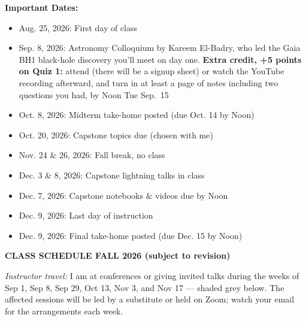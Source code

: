 {\bf \headerfont \color{RoyalBlue} Important Dates:}

\begin{itemize}
    \setlength\itemsep{0.05em}
    \footnotesize
    \item Aug. 25, 2026: First day of class\\
    \item Sep. \phantom{0}8, 2026: Astronomy Colloquium by Kareem El-Badry, who led the Gaia BH1 black-hole discovery you'll meet on day one. {\bf Extra credit, +5 points on Quiz 1:} attend (there will be a signup sheet) or watch the YouTube recording afterward, and turn in at least a page of notes including two questions you had, by Noon Tue Sep.~15\\
    \item Oct. \phantom{0}8, 2026: Midterm take-home posted (due Oct. 14 by Noon)\\
    \item Oct. 20, 2026: Capstone topics due (chosen with me)\\
    \item Nov. 24 \& 26, 2026: Fall break, no class\\
    \item Dec. \phantom{0}3 \& 8, 2026: Capstone lightning talks in class\\
    \item Dec. \phantom{0}7, 2026: Capstone notebooks \& videos due by Noon\\
    \item Dec. \phantom{0}9, 2026: Last day of instruction\\
    \item Dec. \phantom{0}9, 2026: Final take-home posted (due Dec. 15 by Noon)\\
\end{itemize}

{\large \bf \headerfont \color{RoyalBlue} CLASS SCHEDULE FALL 2026 (subject to revision)}

{\footnotesize \emph{Instructor travel:} I am at conferences or giving invited
talks during the weeks of Sep 1, Sep 8, Sep 29, Oct 13, Nov 3, and Nov 17 ---
shaded grey below. The affected sessions will be led by a substitute or held
on Zoom; watch your email for the arrangements each week.}

\newcommand{\travelrow}[1]{\colorbox{gray!25}{\parbox[t]{\dimexpr\linewidth-2\fboxsep\relax}{\makebox[0pt][r]{\textbullet\kern 0.85em}#1}}}


